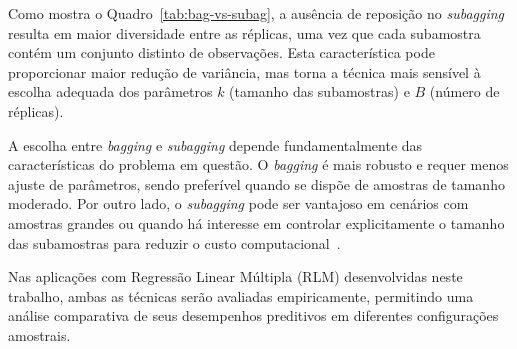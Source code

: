 Como mostra o Quadro~\ref{tab:bag-vs-subag}, a ausência de reposição no \textit{subagging} resulta em maior diversidade entre as réplicas, uma vez que cada subamostra contém um conjunto distinto de observações. Esta característica pode proporcionar maior redução de variância, mas torna a técnica mais sensível à escolha adequada dos parâmetros $k$ (tamanho das subamostras) e $B$ (número de réplicas).


A escolha entre \textit{bagging} e \textit{subagging} depende fundamentalmente das características do problema em questão. O \textit{bagging} é mais robusto e requer menos ajuste de parâmetros, sendo preferível quando se dispõe de amostras de tamanho moderado. Por outro lado, o \textit{subagging} pode ser vantajoso em cenários com amostras grandes ou quando há interesse em controlar explicitamente o tamanho das subamostras para reduzir o custo computacional~\cite{Buhlmann2003}.

Nas aplicações com Regressão Linear Múltipla (RLM) desenvolvidas neste trabalho, ambas as técnicas serão avaliadas empiricamente, permitindo uma análise comparativa de seus desempenhos preditivos em diferentes configurações amostrais.